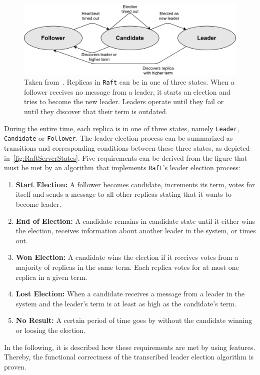 \begin{figure}[!hb]
	\centering
	\includegraphics[width=0.75\linewidth]{images/RaftServerStates}
	\caption{Taken from~\cite{RaftConsensusPaper}. Replicas in \texttt{Raft} can be in one of three states. When a follower receives no message from a leader, it starts an election and tries to become the new leader. Leaders operate until they fail or until they discover that their term is outdated.}
	\label{fig:RaftServerStates}
\end{figure}

During the entire time, each replica is in one of three states, namely \texttt{Leader}, \texttt{Candidate} or \texttt{Follower}.
The leader election process can be summarized as transitions and corresponding conditions between these three states, as depicted in~\autoref{fig:RaftServerStates}.
Five requirements can be derived from the figure that must be met by an algorithm that implements \texttt{Raft}'s leader election process:

\begin{enumerate}
\item \textbf{Start Election:} A follower becomes candidate, increments its term, votes for itself and sends a message to all other replicas stating that it wants to become leader.
\item \textbf{End of Election:} A candidate remains in candidate state until it either wins the election, receives information about another leader in the system, or times out.
\item \textbf{Won Election:} A candidate wins the election if it receives votes from a majority of replicas in the same term. Each replica votes for at most one replica in a given term.
\item \textbf{Lost Election:} When a candidate receives a message from a leader in the system and the leader's term is at least as high as the candidate's term.
\item \textbf{No Result:} A certain period of time goes by without the candidate winning or loosing the election.
\end{enumerate}
In the following, it is described how these requirements are met by using  features.
Thereby, the functional correctness of the transcribed leader election algorithm is proven.

